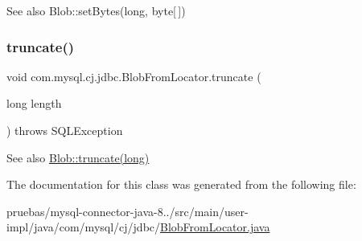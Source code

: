 \begin{DoxySeeAlso}{See also}
Blob\+::set\+Bytes(long, byte\mbox{[}$\,$\mbox{]}) 
\end{DoxySeeAlso}
\mbox{\label{classcom_1_1mysql_1_1cj_1_1jdbc_1_1_blob_from_locator_aa3292b305786ffdcaf63ccaab6ff620b}} 
\subsubsection{\texorpdfstring{truncate()}{truncate()}}
{\footnotesize\ttfamily void com.\+mysql.\+cj.\+jdbc.\+Blob\+From\+Locator.\+truncate (\begin{DoxyParamCaption}\item[{long}]{length }\end{DoxyParamCaption}) throws S\+Q\+L\+Exception}

\begin{DoxySeeAlso}{See also}
\mbox{\hyperlink{classcom_1_1mysql_1_1cj_1_1jdbc_1_1_blob_a423c316889dc06f59cbaee6f77c6401f}{Blob\+::truncate(long)}} 
\end{DoxySeeAlso}


The documentation for this class was generated from the following file\+:\begin{DoxyCompactItemize}
\item 
pruebas/mysql-\/connector-\/java-\/8../src/main/user-\/impl/java/com/mysql/cj/jdbc/\mbox{\hyperlink{_blob_from_locator_8java}{Blob\+From\+Locator.\+java}}\end{DoxyCompactItemize}
